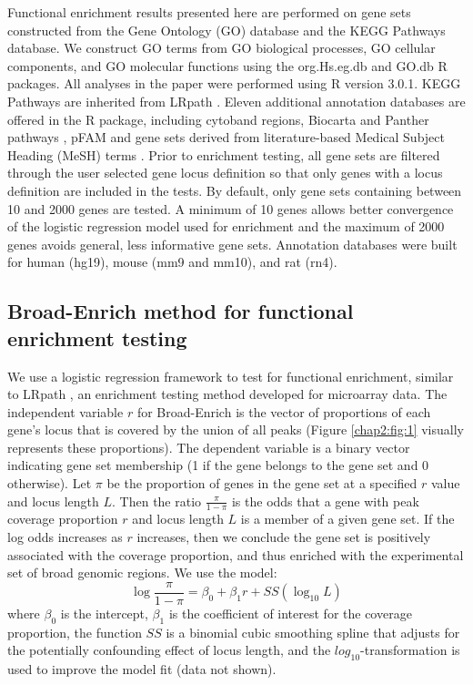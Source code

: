 Functional enrichment results presented here are performed on gene sets constructed from the Gene Ontology (GO) database and the KEGG Pathways database. We construct GO terms from GO biological processes, GO cellular components, and GO molecular functions using the org.Hs.eg.db and GO.db R packages. All analyses in the paper were performed using R version 3.0.1. KEGG Pathways are inherited from LRpath \cite{Kim:2012bk}. Eleven additional annotation databases are offered in the R package, including cytoband regions, Biocarta \cite{Nishimura:2001hd} and Panther pathways \cite{Mi:2013jj}, pFAM \cite{Punta:2012ko} and gene sets derived from literature-based Medical Subject Heading (MeSH) terms \cite{Kim:2012bk, Sartor:2009fo}. Prior to enrichment testing, all gene sets are filtered through the user selected gene locus definition so that only genes with a locus definition are included in the tests. By default, only gene sets containing between 10 and 2000 genes are tested. A minimum of 10 genes allows better convergence of the logistic regression model used for enrichment \cite{Peduzzi:1996cq} and the maximum of 2000 genes avoids general, less informative gene sets. Annotation databases were built for human (hg19), mouse (mm9 and mm10), and rat (rn4).

\subsection{Broad-Enrich method for functional enrichment testing}
\label{broadenrich_methods_broadenrich}

We use a logistic regression framework to test for functional enrichment, similar to LRpath \cite{Sartor:2008by}, an enrichment testing method developed for microarray data. The independent variable $r$ for Broad-Enrich is the vector of proportions of each gene's locus that is covered by the union of all peaks (Figure \ref{chap2:fig:1} visually represents these proportions). The dependent variable is a binary vector indicating gene set membership (1 if the gene belongs to the gene set and 0 otherwise). Let $\pi$ be the proportion of genes in the gene set at a specified $r$ value and locus length $L$. Then the ratio $\frac{\pi}{1 - \pi}$ is the odds that a gene with peak coverage proportion $r$ and locus length $L$ is a member of a given gene set. If the log odds increases as $r$ increases, then we conclude the gene set is positively associated with the coverage proportion, and thus enriched with the experimental set of broad genomic regions. We use the model:
\begin{equation} \label{broadenrich_equation_model}
	\log \frac{\pi}{1 - \pi} = \beta_0 + \beta_1 r + SS (\log_{10} L)
\end{equation}
where $\beta_0$ is the intercept, $\beta_1$ is the coefficient of interest for the coverage proportion, the function $SS$ is a binomial cubic smoothing spline that adjusts for the potentially confounding effect of locus length, and the $log_{10}$-transformation is used to improve the model fit (data not shown).


